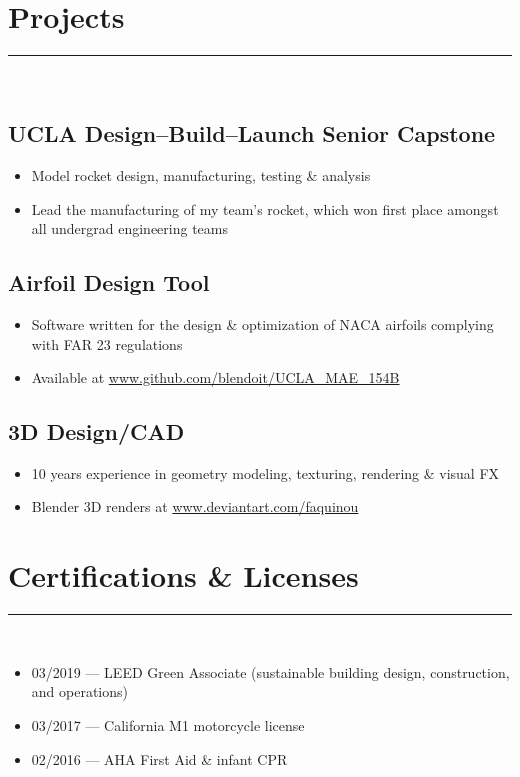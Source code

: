 \documentclass[10pt]{article}
\begin{document}
\section*{Projects}
\rule{\linewidth}{1pt}\\
\subsection*{UCLA Design--Build--Launch Senior Capstone}
\begin{itemize}
    \item Model rocket design, manufacturing, testing \& analysis
    \item Lead the manufacturing of my team's rocket, which won first place amongst all undergrad engineering teams
\end{itemize}
\subsection*{Airfoil Design Tool}
\begin{itemize}
    \item Software written for the design \& optimization of NACA airfoils complying with FAR 23 regulations
    \item  Available at \url{www.github.com/blendoit/UCLA_MAE_154B}
\end{itemize}
\subsection*{3D Design/CAD}
\begin{itemize}
    \item 10 years experience in geometry modeling, texturing, rendering \& visual FX
    \item Blender 3D renders at \url{www.deviantart.com/faquinou}
\end{itemize}

\section*{Certifications \& Licenses}
\rule{\linewidth}{1pt}\\[0.2cm]
\begin{itemize}
	\item 03/2019 --- LEED Green Associate (sustainable building design, construction, and operations)
    \item 03/2017 --- California M1 motorcycle license
    \item 02/2016 --- AHA First Aid \& infant CPR
\end{itemize}
\end{document}
